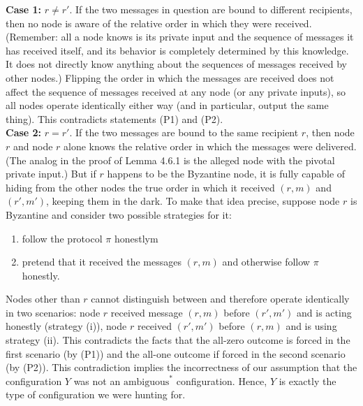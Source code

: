 \noindent
\textbf{Case 1:} $r \neq r'$. If the two messages in question are bound to different recipients, then
no node is aware of the relative order in which they were received. (Remember: all a node
knows is its private input and the sequence of messages it has received itself, and its behavior
is completely determined by this knowledge. It does not directly know anything about the
sequences of messages received by other nodes.) Flipping the order in which the messages
are received does not affect the sequence of messages received at any node (or any private
inputs), so all nodes operate identically either way (and in particular, output the same thing).
This contradicts statements (P1) and (P2).\\

\noindent
\textbf{Case 2:} $r = r'$. If the two messages are bound to the same recipient $r$, then node $r$ and
node $r$ alone knows the relative order in which the messages were delivered. (The analog in
the proof of Lemma 4.6.1 is the alleged node with the pivotal private input.) But if $r$ happens
to be the Byzantine node, it is fully capable of hiding from the other nodes the true order in
which it received $(r, m)$ and $(r', m')$, keeping them in the dark. To make that idea precise,
suppose node $r$ is Byzantine and consider two possible strategies for it:
\begin{enumerate}[label=(\roman*)]
    \item follow the protocol $\pi$ honestlym
    \item pretend that it received the messages $(r, m)$ and otherwise follow $\pi$ honestly.
\end{enumerate}
Nodes other than $r$ cannot distinguish between and therefore operate identically in two
scenarios: node $r$ received message $(r, m)$ before $(r', m')$ and is acting honestly (strategy (i)),
node $r$ received $(r',m')$ before $(r, m)$ and is using strategy (ii). This contradicts the facts
that the all-zero outcome is forced in the first scenario (by (P1)) and the all-one outcome
if forced in the second scenario (by (P2)). This contradiction implies the incorrectness of
our assumption that the configuration $Y$ was not an $\text{ambiguous}^*$
configuration. Hence, $Y$ is exactly the type of configuration we were hunting for.

